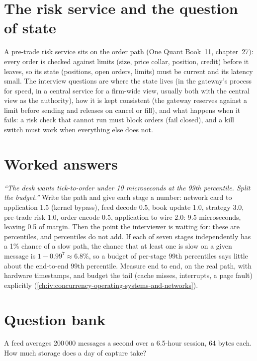 \section{The risk service and the question of state}

A pre-trade risk service sits on the order path (One Quant Book~11, chapter~27): every order is checked against limits (size,
price collar, position, credit) before it leaves, so its state (positions, open orders, limits) must be current and its latency
small. The interview questions are where the state lives (in the gateway's process for speed, in a central service for a firm-wide
view, usually both with the central view as the authority), how it is kept consistent (the gateway reserves against a limit
before sending and releases on cancel or fill), and what happens when it fails: a risk check that cannot run must block orders
(fail closed), and a kill switch must work when everything else does not.

\section{Worked answers}

\begin{example}\label{ex:iv:system-design:budget}
\emph{``The desk wants tick-to-order under 10 microseconds at the 99th percentile. Split the budget.''} Write the path and
give each stage a number: network card to application 1.5 (kernel bypass), feed decode 0.5, book update 1.0, strategy 3.0,
pre-trade risk 1.0, order encode 0.5, application to wire 2.0: 9.5 microseconds, leaving 0.5 of margin. Then the point the
interviewer is waiting for: these are percentiles, and percentiles do not add. If each of seven stages independently has a
1\% chance of a slow path, the chance that at least one is slow on a given message is $1 - 0.99^7 \approx 6.8\%$, so a
budget of per-stage 99th percentiles says little about the end-to-end 99th percentile. Measure end to end, on the real
path, with hardware timestamps, and budget the tail (cache misses, interrupts, a page fault) explicitly
(\cref{ch:iv:concurrency-operating-systems-and-networks}).
\end{example}

\section{Question bank}

\begin{interviewq}\label{iq:iv:system-design:1}
A feed averages 200\,000 messages a second over a 6.5-hour session, 64 bytes each. How much storage does a day of capture take?
\end{interviewq}

